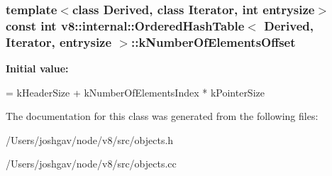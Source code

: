 \subsubsection[{\texorpdfstring{k\+Number\+Of\+Elements\+Offset}{kNumberOfElementsOffset}}]{\setlength{\rightskip}{0pt plus 5cm}template$<$class Derived, class Iterator, int entrysize$>$ const int {\bf v8\+::internal\+::\+Ordered\+Hash\+Table}$<$ Derived, Iterator, entrysize $>$\+::k\+Number\+Of\+Elements\+Offset\hspace{0.3cm}{\ttfamily [static]}}\hypertarget{classv8_1_1internal_1_1_ordered_hash_table_a72751e344469c5e1e186c5354c7f93fa}{}\label{classv8_1_1internal_1_1_ordered_hash_table_a72751e344469c5e1e186c5354c7f93fa}
{\bfseries Initial value\+:}
\begin{DoxyCode}
=
      kHeaderSize + kNumberOfElementsIndex * kPointerSize
\end{DoxyCode}


The documentation for this class was generated from the following files\+:\begin{DoxyCompactItemize}
\item 
/\+Users/joshgav/node/v8/src/objects.\+h\item 
/\+Users/joshgav/node/v8/src/objects.\+cc\end{DoxyCompactItemize}

